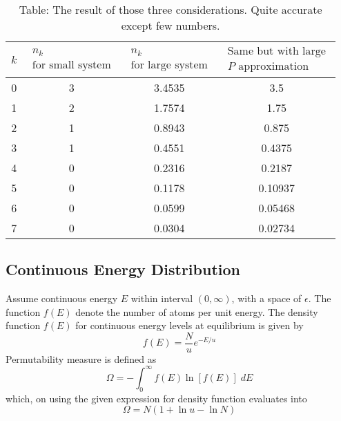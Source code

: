 \documentclass[../../../Main.tex]{subfiles}
\begin{document}
\begin{table}[h]
    \centering
    \caption*{Table: The result of those three considerations. Quite accurate except few numbers.}
    \begin{tabular}{cccc} 
        \toprule
        $k$&$\begin{array}{c}
            n_k\\
            \text{for small system}
        \end{array}$ &$\begin{array}{c}
            n_k\\
            \text{for large system}
        \end{array}$ &$\begin{array}{c}
            \text{Same but with large}\\
            P\text{ approximation}
        \end{array}$\\ 
        \midrule
        0 &3&3.4535&3.5 \\
        1 &2&1.7574&1.75 \\
        2 &1&0.8943&0.875 \\
        3 &1&0.4551&0.4375 \\
        4 &0&0.2316&0.2187 \\
        5 &0&0.1178&0.10937 \\
        6 &0&0.0599&0.05468 \\
        7 &0&0.0304&0.02734 \\
        \bottomrule
    \end{tabular}
\end{table}

\subsection*{Continuous Energy Distribution}
Assume continuous energy $E$ within interval $(0,\infty)$, with a space of $\epsilon$. The function $f(E)$ denote the number of atoms per unit energy. The density function $f(E) $ for continuous energy levels at equilibrium is given by
\begin{equation*}
    f(E)=\frac{N}{u}e^{-E/u}
\end{equation*}
Permutability measure is defined as 
\begin{equation*}
    \Omega=-\int_{0}^{\infty}f(E)\ln\left[f(E)\right]\;dE
\end{equation*}
which, on using the given expression for density function evaluates into 
\begin{equation*}
    \Omega=N(1+\ln u-\ln N)
\end{equation*}
\end{document}
